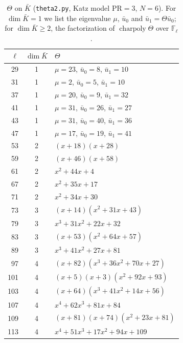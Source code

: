 \documentclass[11pt]{amsart}
\newcommand{\Fl}{\mathbb{F}_\ell}
\DeclareMathOperator{\charpoly}{charpoly}
\theoremstyle{plain}
\theoremstyle{definition}
\numberwithin{equation}{section}
\begin{document}
\begin{table}[ht]
\centering\small
\caption{$\Theta$ on $\bar K$ (\texttt{theta2.py}, Katz model $\mathrm{PR}=3$, $N=6$). For $\dim\bar K=1$ we list the eigenvalue $\mu$,
$\bar u_0$ and $\bar u_1=\Theta\bar u_0$; for $\dim\bar K\ge2$, the factorization of $\charpoly\Theta$ over $\Fl$.}\label{tab:theta}
\begin{tabular}{@{}rcl@{}}
\toprule
$\ell$ & $\dim\bar K$ & $\Theta$\\
\midrule
29 & 1 & $\mu=23$, $\bar u_0=8$, $\bar u_1=10$\\
31 & 1 & $\mu=2$, $\bar u_0=5$, $\bar u_1=10$\\
37 & 1 & $\mu=20$, $\bar u_0=9$, $\bar u_1=32$\\
41 & 1 & $\mu=31$, $\bar u_0=26$, $\bar u_1=27$\\
43 & 1 & $\mu=31$, $\bar u_0=40$, $\bar u_1=36$\\
47 & 1 & $\mu=17$, $\bar u_0=19$, $\bar u_1=41$\\
53 & 2 & $(x+18)(x+28)$\\
59 & 2 & $(x+46)(x+58)$\\
61 & 2 & $x^2+44x+4$\\
67 & 2 & $x^2+35x+17$\\
71 & 2 & $x^2+34x+30$\\
73 & 3 & $(x+14)(x^2+31x+43)$\\
79 & 3 & $x^3+31x^2+22x+32$\\
83 & 3 & $(x+53)(x^2+64x+57)$\\
89 & 3 & $x^3+41x^2+27x+81$\\
97 & 4 & $(x+82)(x^3+36x^2+70x+27)$\\
101 & 4 & $(x+5)(x+3)(x^2+92x+93)$\\
103 & 4 & $(x+64)(x^3+41x^2+14x+56)$\\
107 & 4 & $x^4+62x^3+81x+84$\\
109 & 4 & $(x+81)(x+74)(x^2+23x+81)$\\
113 & 4 & $x^4+51x^3+17x^2+94x+109$\\
\bottomrule
\end{tabular}
\end{table}
\end{document}
